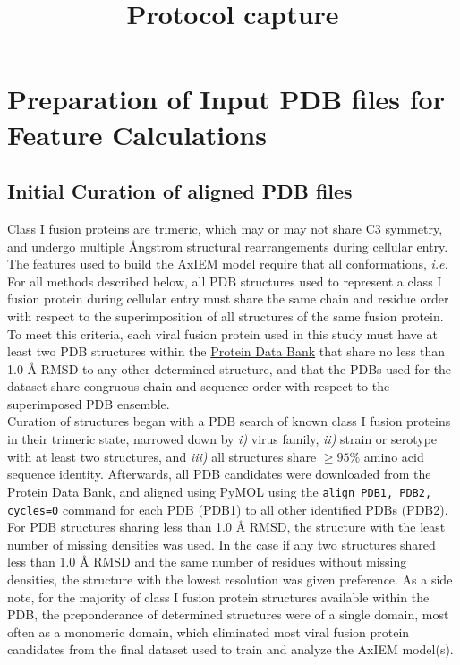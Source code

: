 \documentclass[10pt]{article}
\title{Protocol capture}
\date{}
\begin{document}
\maketitle
\thispagestyle{empty}

\section{Preparation of Input PDB files for Feature Calculations}

\subsection{Initial Curation of aligned PDB files}

Class I fusion proteins are trimeric, which may or may not share C3 symmetry, and undergo multiple \r{A}ngstrom structural rearrangements during cellular entry.  The features used to build the AxIEM model require that all conformations, \textit{i.e.} For all methods described below, all PDB structures used to represent a class I fusion protein during cellular entry must share the same chain and residue order with respect to the superimposition of all structures of the same fusion protein. To meet this criteria, each viral fusion protein used in this study must have at least two PDB structures within the \href{www.rcsb.org}{Protein Data Bank} that share no less than 1.0 \r{A} RMSD to any other determined structure, and that the PDBs used for the dataset share congruous chain and sequence order with respect to the superimposed PDB ensemble. \\

Curation of structures began with a PDB search of known class I fusion proteins in their trimeric state, narrowed down by \textit{i)} virus family, \textit{ii)} strain or serotype with at least two structures, and \textit{iii)} all structures share $\geq 95\%$ amino acid sequence identity. Afterwards, all PDB candidates were downloaded from the Protein Data Bank, and aligned using PyMOL using the \texttt{align PDB1, PDB2, cycles=0} command for each PDB (PDB1) to all other identified PDBs (PDB2). For PDB structures sharing less than 1.0 \r{A} RMSD, the structure with the least number of missing densities was used. In the case if any two structures shared less than 1.0 \r{A} RMSD and the same number of residues without missing densities, the structure with the lowest resolution was given preference. As a side note, for the majority of class I fusion protein structures available within the PDB, the preponderance of determined structures were of a single domain, most often as a monomeric domain, which eliminated most viral fusion protein candidates from the final dataset used to train and analyze the AxIEM model(s).\\
\end{document}
